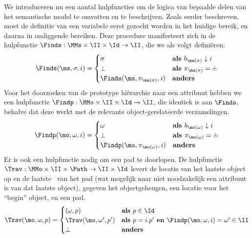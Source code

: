 We introduceren nu een aantal hulpfuncties om de logica van bepaalde delen van het semantische model te omvatten en te beschrijven.
Zoals eerder beschreven, moet de definitie van een variabele eerst gezocht worden in het huidige bereik, en daarna in omliggende bereiken. Deze procedure manifesteert zich in de hulpfunctie $\Finds : \MMs \times \II \times \Id \to \II$, die we als volgt definiëren:
%
\begin{equation*}
  \Finds(\ms, \sigma, i) = \begin{cases}
    \sigma & \textbf{als } b_{\ms(\sigma)} \downarrow i \\
    \bot & \textbf{als } \pi_{\ms(\sigma)} = \nil \\
    \Finds(\ms, \pi_{\ms(\sigma)}, i) & \textbf{anders}
  \end{cases}
\end{equation*}
%
Voor het doorzoeken van de prototype hiërarchie naar een attribuut hebben we een hulpfunctie $\Findp : \MMo \times \II \times \Id \to \II$, die identiek is aan $\Finds$, behalve dat deze werkt met de relevante object-gerelateerde verzamelingen.
%
\begin{equation*}
  \Findp(\mo, \omega, i) = \begin{cases}
    \omega & \textbf{als } b_{\mo(\omega)} \downarrow i \\
    \bot & \textbf{als } \pi_{\mo(\omega)} = \nil \\
    \Findp(\mo, \pi_{\mo(\omega)}, i) & \textbf{anders}
  \end{cases}
\end{equation*}
%
Er is ook een hulpfunctie nodig om een pad te doorlopen. De hulpfunctie $\Trav : \MMo \times \II \times \Path \to \II \times \Id$ levert de locatie van het laatste object op en de laatste \Id\ van het pad (wat mogelijk naar niet noodzakelijk een attribuut is van dat laatste object), gegeven het objectgeheugen, een locatie voor het “begin” object, en een pad.
%
\begin{equation*}
  \Trav(\mo, \omega, p) = \begin{cases}
    (\omega, p) & \textbf{als } p \in \Id \\
    \Trav(\mo, \omega', p') & \textbf{als } p = i.p' \textbf{ en } \Findp(\mo, \omega, i) = \omega' \in \II \\
    \bot & \textbf{anders}
  \end{cases}
\end{equation*}
%

